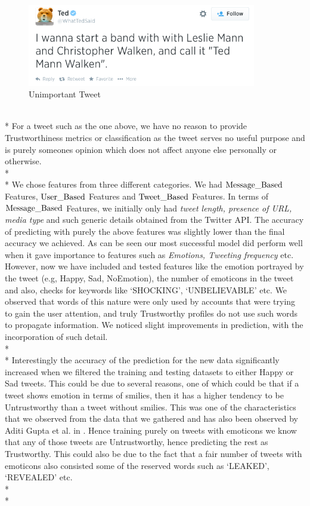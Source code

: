 \begin{figure}[h!]
  \centering
\includegraphics[width=10cm]{Ted}
  \caption[Unimportant Tweet]
   {Unimportant Tweet}
\end{figure}\leavevmode\\*
For a tweet such as the one above, we have no reason to provide Trustworthiness metrics or classification as the tweet serves no useful purpose and is purely someones opinion which does not affect anyone else personally or otherwise. \\*\\*
\noindent
We chose features from three different categories. We had $\textup{Message\_Based}$ Features, $\textup{User\_Based}$ Features and $\textup{Tweet\_Based}$ Features. In terms of $\textup{Message\_Based}$ Features, we initially only had \textit{tweet length, presence of URL, media type} and such generic details obtained from the Twitter API. The accuracy of predicting with purely the above features was slightly lower than the final accuracy we achieved. As can be seen our most successful model did perform well when it gave importance to features such as \textit{Emotions, Tweeting frequency} etc. However, now we have included and tested features like the emotion portrayed by the tweet (e.g, Happy, Sad, NoEmotion), the number of emoticons in the tweet and also, checks for keywords like `SHOCKING', `UNBELIEVABLE' etc. We observed that words of this nature were only used by accounts that were trying to gain the user attention, and truly Trustworthy profiles do not use such words to propagate information. We noticed slight improvements in prediction, with the incorporation of such detail. \\*\\*
Interestingly the accuracy of the prediction for the new data significantly increased when we filtered the training and testing datasets to either Happy or Sad tweets. This could be due to several reasons, one of which could be that if a tweet shows emotion in terms of smilies, then it has a higher tendency to be Untrustworthy than a tweet without smilies. This was one of the characteristics that we observed from the data that we gathered and has also been observed by Aditi Gupta et al. in \cite{11}. Hence training purely on tweets with emoticons we know that any of those tweets are Untrustworthy, hence predicting the rest as Trustworthy. This could also be due to the fact that a fair number of tweets with emoticons also consisted some of the reserved words such as `LEAKED', `REVEALED' etc. \\*\\*
